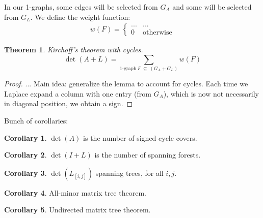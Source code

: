 \documentclass[a4paper, 11pt]{article}
\newtheorem{theorem}{Theorem}[section]
\theoremstyle{definition}
\newtheorem{corollary}{Corollary}[theorem]
\begin{document}
In our 1-graphs, some edges will be selected from $G_A$ and some will be selected from $G_L$. We define the weight function:
\begin{align*}
  w(F) = \begin{cases}
    ... & ... \\
    0 & \text{otherwise}
  \end{cases}
\end{align*}

\begin{theorem} Kirchoff's theorem with cycles.
  \[
    \det(A + L) = \sum_{\text{1-graph}\ F\ \subseteq\ (G_A + G_L)} w(F)
  \]
\end{theorem}
\begin{proof}
  ... Main idea: generalize the lemma to account for cycles. Each time we Laplace expand a column with one entry (from $G_A$), which is now not necessarily in diagonal position, we obtain a sign.
\end{proof}

Bunch of corollaries:

\begin{corollary}
  $\det(A)$ is the number of signed cycle covers.
\end{corollary}

\begin{corollary}
  $\det(I + L)$ is the number of spanning forests.
\end{corollary}

\begin{corollary}
  $\det(L_{[i,j]})$ spanning trees, for all $i,j$.
\end{corollary}

\begin{corollary}
  All-minor matrix tree theorem.
\end{corollary}

\begin{corollary}
  Undirected matrix tree theorem.
\end{corollary}
\end{document}
